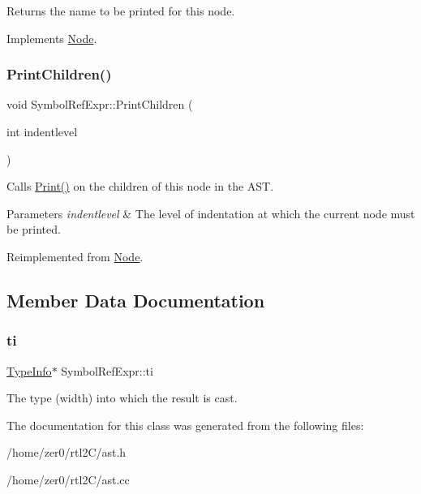 Returns the name to be printed for this node. 

Implements \hyperlink{class_node_a56e29657306ffb004d69c6929ae44269}{Node}.

\mbox{\label{class_symbol_ref_expr_a17635ba3b6120561fd912d2487d9a897}} 
\subsubsection{\texorpdfstring{Print\+Children()}{PrintChildren()}}
{\footnotesize\ttfamily void Symbol\+Ref\+Expr\+::\+Print\+Children (\begin{DoxyParamCaption}\item[{int}]{indentlevel }\end{DoxyParamCaption})\hspace{0.3cm}{\ttfamily [virtual]}}

Calls \hyperlink{class_node_a9ef727fd72d1a37792b3db60a8a479dd}{Print()} on the children of this node in the A\+ST. 
\begin{DoxyParams}{Parameters}
{\em indentlevel} & The level of indentation at which the current node must be printed. \\
\hline
\end{DoxyParams}


Reimplemented from \hyperlink{class_node_a3e67ec8d22182b721717af14fe0c3000}{Node}.



\subsection{Member Data Documentation}
\mbox{\label{class_symbol_ref_expr_ab6892732ae00329f8526e8c1fe5e28b5}} 
\subsubsection{\texorpdfstring{ti}{ti}}
{\footnotesize\ttfamily \hyperlink{class_type_info}{Type\+Info}$\ast$ Symbol\+Ref\+Expr\+::ti\hspace{0.3cm}{\ttfamily [protected]}}

The type (width) into which the result is cast. 

The documentation for this class was generated from the following files\+:\begin{DoxyCompactItemize}
\item 
/home/zer0/rtl2\+C/ast.\+h\item 
/home/zer0/rtl2\+C/ast.\+cc\end{DoxyCompactItemize}
